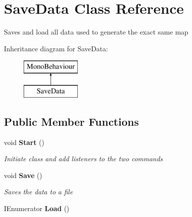 \section{Save\+Data Class Reference}
\label{class_save_data}


Saves and load all data used to generate the exact same map  


Inheritance diagram for Save\+Data\+:\begin{figure}[H]
\begin{center}
\leavevmode
\includegraphics[height=2.000000cm]{class_save_data}
\end{center}
\end{figure}
\subsection*{Public Member Functions}
\begin{DoxyCompactItemize}
\item 
void \textbf{ Start} ()
\begin{DoxyCompactList}\small\item\em Initiate class and add listeners to the two commands \end{DoxyCompactList}\item 
void \textbf{ Save} ()
\begin{DoxyCompactList}\small\item\em Saves the data to a file \end{DoxyCompactList}\item 
I\+Enumerator \textbf{ Load} ()
\end{DoxyCompactItemize}
